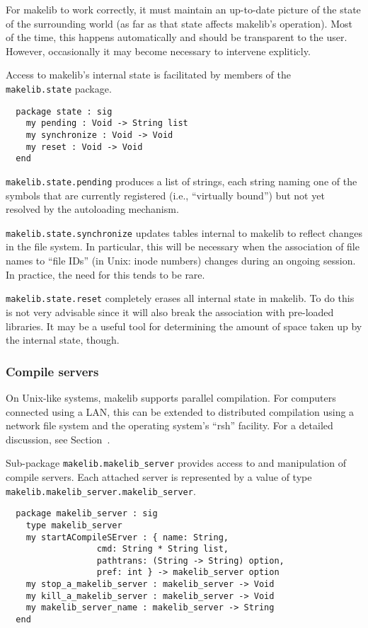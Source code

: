 For makelib to work correctly, it must maintain an up-to-date picture of
the state of the surrounding world (as far as that state affects makelib's
operation).  Most of the time, this happens automatically and should be
transparent to the user.  However, occasionally it may become
necessary to intervene expliticly.

Access to makelib's internal state is facilitated by members of the {\tt
makelib.state} package.

\begin{verbatim}
  package state : sig
    my pending : Void -> String list
    my synchronize : Void -> Void
    my reset : Void -> Void
  end
\end{verbatim}

{\tt makelib.state.pending} produces a list of strings, each string naming
one of the symbols that are currently registered (i.e., ``virtually
bound'') but not yet resolved by the autoloading mechanism.

{\tt makelib.state.synchronize} updates tables internal to makelib to reflect
changes in the file system.  In particular, this will be necessary
when the association of file names to ``file IDs'' (in Unix: inode
numbers) changes during an ongoing session.  In practice, the need for
this tends to be rare.

{\tt makelib.state.reset} completely erases all internal state in makelib.  To
do this is not very advisable since it will also break the association
with pre-loaded libraries.  It may be a useful tool for determining
the amount of space taken up by the internal state, though.

\subsubsection{Compile servers}

On Unix-like systems, makelib supports parallel compilation.  For computers
connected using a LAN, this can be extended to distributed compilation
using a network file system and the operating system's ``rsh''
facility.  For a detailed discussion, see Section~.

Sub-package {\tt makelib.makelib_server} provides access to and manipulation
of compile servers.  Each attached server is represented by a value of
type {\tt makelib.makelib_server.makelib_server}.

\begin{verbatim}
  package makelib_server : sig
    type makelib_server
    my startACompileSErver : { name: String,
                  cmd: String * String list,
                  pathtrans: (String -> String) option,
                  pref: int } -> makelib_server option
    my stop_a_makelib_server : makelib_server -> Void
    my kill_a_makelib_server : makelib_server -> Void
    my makelib_server_name : makelib_server -> String
  end
\end{verbatim}

